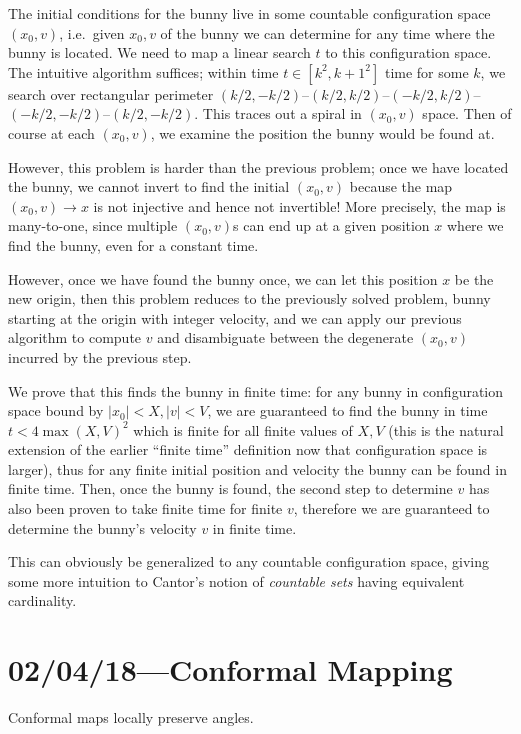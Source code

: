 \documentclass[12pt]{report}
\newcommand*{\abs}[1]{\left|#1\right|}
\begin{document}
The initial conditions for the bunny live in some countable configuration space
$(x_0, v)$, i.e.\ given $x_0, v$ of the bunny we can determine for any time
where the bunny is located. We need to map a linear search $t$ to this
configuration space. The intuitive algorithm suffices; within time $t \in [k^2,
k + 1^2]$ time for some $k$, we search over rectangular perimeter $(k/2,
-k/2)$--$(k/2, k/2)$--$(-k/2, k/2)$--$(-k/2, -k/2)$--$(k/2, -k/2)$. This traces
out a spiral in $(x_0, v)$ space. Then of course at each $(x_0, v)$, we examine
the position the bunny would be found at.

However, this problem is harder than the previous problem; once we have located
the bunny, we cannot invert to find the initial $(x_0, v)$ because the map
$(x_0, v) \to x$ is not injective and hence not invertible! More precisely, the
map is many-to-one, since multiple $(x_0, v)$s can end up at a given position
$x$ where we find the bunny, even for a constant time.

However, once we have found the bunny once, we can let this position $x$ be the
new origin, then this problem reduces to the previously solved problem, bunny
starting at the origin with integer velocity, and we can apply our previous
algorithm to compute $v$ and disambiguate between the degenerate $(x_0, v)$
incurred by the previous step.

We prove that this finds the bunny in finite time: for any bunny in
configuration space bound by $\abs{x_0} < X, \abs{v} < V$, we are guaranteed to
find the bunny in time $t < 4\max(X, V)^2$ which is finite for all finite values
of $X, V$ (this is the natural extension of the earlier ``finite time''
definition now that configuration space is larger), thus for any finite initial
position and velocity the bunny can be found in finite time. Then, once the
bunny is found, the second step to determine $v$ has also been proven to take
finite time for finite $v$, therefore we are guaranteed to determine the bunny's
velocity $v$ in finite time.

This can obviously be generalized to any countable configuration space, giving
some more intuition to Cantor's notion of \emph{countable sets} having
equivalent cardinality.

\chapter{02/04/18---Conformal Mapping}

Conformal maps locally preserve angles.
\end{document}
